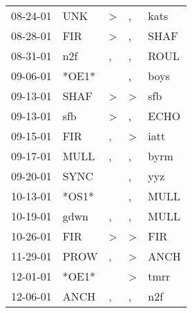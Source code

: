 \begin{supertabular}{p{0.07\textwidth}p{0.06\textwidth}p{0.02\textwidth}p{0.02\textwidth}p{0.06\textwidth}}
          08-24-01\textsuperscript{} &            UNK\textsuperscript{} &     \textgreater &             , &           kats\textsuperscript{} \\
          08-28-01\textsuperscript{} &            FIR\textsuperscript{} &     \textgreater &             , &           SHAF\textsuperscript{} \\
          08-31-01\textsuperscript{} &            n2f\textsuperscript{} &                , &             , &           ROUL\textsuperscript{} \\
          09-06-01\textsuperscript{} &                            *OE1* &                  &             , &           boys\textsuperscript{} \\
          09-13-01\textsuperscript{} &           SHAF\textsuperscript{} &     \textgreater &  \textgreater &            sfb\textsuperscript{} \\
          09-13-01\textsuperscript{} &            sfb\textsuperscript{} &     \textgreater &             , &           ECHO\textsuperscript{} \\
          09-15-01\textsuperscript{} &            FIR\textsuperscript{} &                , &  \textgreater &           iatt\textsuperscript{} \\
          09-17-01\textsuperscript{} &           MULL\textsuperscript{} &                , &             , &           byrm\textsuperscript{} \\
          09-20-01\textsuperscript{} &           SYNC\textsuperscript{} &                  &             , &            yyz\textsuperscript{} \\
          10-13-01\textsuperscript{} &                            *OS1* &                  &             , &           MULL\textsuperscript{} \\
          10-19-01\textsuperscript{} &           gdwn\textsuperscript{} &                , &             , &           MULL\textsuperscript{} \\
          10-26-01\textsuperscript{} &            FIR\textsuperscript{} &     \textgreater &  \textgreater &            FIR\textsuperscript{} \\
          11-29-01\textsuperscript{} &           PROW\textsuperscript{} &                , &  \textgreater &           ANCH\textsuperscript{} \\
          12-01-01\textsuperscript{} &                            *OE1* &                  &  \textgreater &           tmrr\textsuperscript{} \\
          12-06-01\textsuperscript{} &           ANCH\textsuperscript{} &                , &             , &            n2f\textsuperscript{} \\

\end{supertabular}
